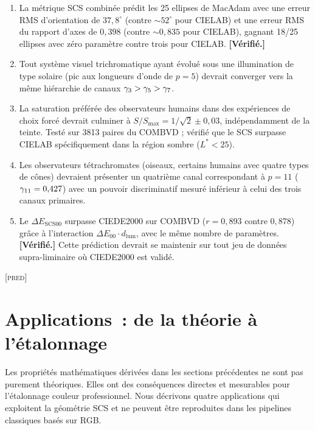 \documentclass[12pt,a4paper]{article}
\begin{document}
\begin{predictionbox}
\begin{enumerate}[nosep]
\item La m\'etrique SCS combin\'ee pr\'edit les 25 ellipses de MacAdam
  avec une erreur RMS d'orientation de $37{,}8^\circ$ (contre
  $\sim\!52^\circ$ pour CIELAB) et une erreur RMS du rapport d'axes de
  $0{,}398$ (contre $\sim\!0{,}835$ pour CIELAB), gagnant 18/25 ellipses
  avec z\'ero param\`etre contre trois pour CIELAB.
  \textbf{[V\'erifi\'e.]}
\item Tout syst\`eme visuel trichromatique ayant \'evolu\'e sous une
  illumination de type solaire (pic aux longueurs d'onde de $p=5$)
  devrait converger vers la m\^eme hi\'erarchie de canaux
  $\gamma_{3} > \gamma_{5} > \gamma_{7}$.
\item La saturation pr\'ef\'er\'ee des observateurs humains dans des
  exp\'eriences de choix forc\'e devrait culminer \`a
  $S/S_{\max} = 1/\sqrt{2} \pm 0{,}03$, ind\'ependamment de la teinte.
  Test\'e sur 3813 paires du COMBVD ; v\'erifi\'e que le SCS surpasse
  CIELAB sp\'ecifiquement dans la r\'egion sombre ($L^*<25$).
\item Les observateurs t\'etrachromates (oiseaux, certains humains avec
  quatre types de c\^ones) devraient pr\'esenter un quatri\`eme canal
  correspondant \`a $p = 11$ ($\gamma_{11} = 0{,}427$) avec un pouvoir
  discriminatif mesur\'e inf\'erieur \`a celui des trois canaux
  primaires.
\item Le $\Delta E_{\mathrm{SCS00}}$ surpasse CIEDE2000 sur COMBVD
  ($r = 0{,}893$ contre $0{,}878$) gr\^ace \`a l'interaction
  $\Delta E_{00} \cdot d_{\mathrm{lum}}$, avec le m\^eme nombre de
  param\`etres. \textbf{[V\'erifi\'e.]} Cette pr\'ediction devrait se
  maintenir sur tout jeu de donn\'ees supra-liminaire o\`u CIEDE2000 est
  valid\'e.
\end{enumerate}
\textsc{[pred]}
\end{predictionbox}

\section{Applications~: de la th\'eorie \`a l'\'etalonnage}
\label{sec:applications}

Les propri\'et\'es math\'ematiques d\'eriv\'ees dans les sections
pr\'ec\'edentes ne sont pas purement th\'eoriques. Elles ont des
cons\'equences directes et mesurables pour l'\'etalonnage couleur
professionnel. Nous d\'ecrivons quatre applications qui exploitent la
g\'eom\'etrie SCS et ne peuvent \^etre reproduites dans les pipelines
classiques bas\'es sur RGB.
\end{document}
